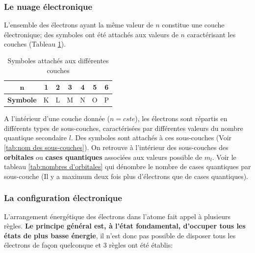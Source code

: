 \documentclass{article}
\begin{document}
\subsubsection{Le nuage électronique}

L'ensemble des électrons ayant la même valeur de $n$ constitue une couche électronique; des symboles ont été attachés aux valeurs de $n$ caractérisant les couches (Tableau \ref{tab:symboles associes couches}).

\begin{table}[h]
    \centering
    \begin{tabular}{|c|c|c|c|c|c|c|}
        \hline
        $\bm{n}$ & 1 &  2 & 3 & 4 & 5 & 6 \\ \hline
        \textbf{Symbole} & K & L & M & N & O & P \\ \hline
    \end{tabular}
    \caption{Symboles attachés aux différentes couches}
    \label{tab:symboles associes couches}
\end{table}

A l'intérieur d'une couche donnée ($n = cste$), les électrons sont répartis en différents types de sous-couches, caractérisées par différentes valeurs du nombre quantique secondaire $l$. Des symboles sont attachés à ces sous-couches (Voir \ref{tab:nom des sous-couches}). On retrouve à l'intérieur des sous-couches des \textbf{orbitales} ou \textbf{cases quantiques} associées aux valeurs possible de $m_l$. Voir le tableau \ref{tab:nombres d'orbitales} qui dénombre le nombre de cases quantiques par sous-couche (Il y a maximum deux fois plus d'électrons que de cases quantiques).

\newpage

\subsubsection{La configuration électronique}

L'arrangement énergétique des électrons dans l'atome fait appel à plusieurs règles.
\textbf{Le principe général est, à l'état fondamental, d'occuper tous les états de plus basse énergie},
il n'est donc pas possible de disposer tous les électrons de façon quelconque et 3
règles ont été établis:
\end{document}
